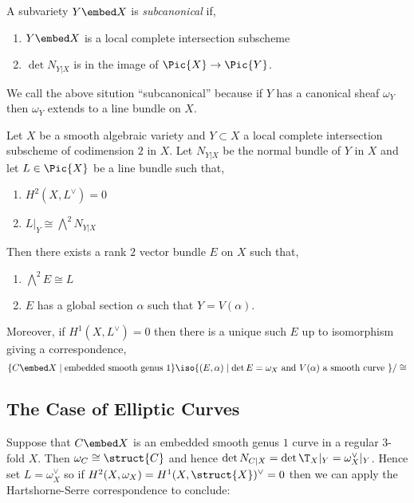 \documentclass[12pt]{article}
\begin{document}
\begin{defn}
A subvariety $Y \embed X$ is \textit{subcanonical} if,
\begin{enumerate}
\item $Y \embed X$ is a local complete intersection subscheme
\item $\det{N_{Y|X}}$ is in the image of $\Pic{X} \to \Pic{Y}$.
\end{enumerate} 
\end{defn}

\begin{rmk}
We call the above sitution ``subcanonical'' because if $Y$ has a canonical sheaf $\omega_Y$ then $\omega_Y$ extends to a line bundle on $X$. 
\end{rmk}

\begin{cor}
Let $X$ be a smooth algebraic variety and $Y \subset X$ a local complete intersection subscheme of codimension $2$ in $X$. Let $N_{Y|X}$ be the normal bundle of $Y$ in $X$ and let $L \in \Pic{X}$ be a line bundle such that,
\begin{enumerate}
\item $H^2(X, L^\vee) = 0$
\item $L|_Y \cong \bigwedge^2 N_{Y|X}$
\end{enumerate}
Then there exists a rank $2$ vector bundle $E$ on $X$ such that,
\begin{enumerate}
\item $\bigwedge^2 E \cong L$
\item $E$ has a global section $\alpha$ such that $Y = V(\alpha)$.
\end{enumerate}
Moreover, if $H^1(X, L^\vee) = 0$ then there is a unique such $E$ up to isomorphism giving a correspondence,
\[ \{ C \embed X \mid \text{embedded smooth genus } 1 \} \iso \{ (E, \alpha) \mid \det{E} = \omega_X \text{ and } V(\alpha) \text{ a smooth curve } \} / \cong \]
\end{cor}

\subsection{The Case of Elliptic Curves}

Suppose that $C \embed X$ is an embedded smooth genus $1$ curve in a regular $3$-fold $X$. Then $\omega_C \cong \struct{C}$ and hence $\det{N_{C|X}} = \det{\T_X|_Y} = \omega_X^\vee|_Y$. Hence set $L = \omega_X^\vee$ so if $H^2(X, \omega_X) = H^1(X, \struct{X})^\vee = 0$ then we can apply the Hartshorne-Serre correspondence to conclude:
\end{document}
